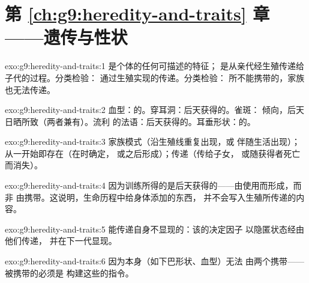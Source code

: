 \section*{第 \ref{ch:g9:heredity-and-traits} 章——遗传与性状}

\begin{solution}{exo:g9:heredity-and-traits:1}
是个体的任何可描述的特征；
是从亲代经生殖传递给子代的过程。分类检验：
通过生殖实现的传递。分类检验：
所不能携带的，家族也无法传递。
\end{solution}

\begin{solution}{exo:g9:heredity-and-traits:2}
血型：的。穿耳洞：后天获得的。雀斑：
倾向，后天日晒所致（两者兼有）。流利
的法语：后天获得的。耳垂形状：的。
\end{solution}

\begin{solution}{exo:g9:heredity-and-traits:3}
家族模式（沿生殖线重复出现，或
伴随生活出现）；从一开始即存在（在时确定，
或之后形成）；传递（传给子女，
或随获得者死亡而消失）。
\end{solution}

\begin{solution}{exo:g9:heredity-and-traits:4}
因为训练所得的是后天获得的——由使用而形成，而非
由携带。这说明，生命历程中给身体添加的东西，
并不会写入生殖所传递的内容。
\end{solution}

\begin{solution}{exo:g9:heredity-and-traits:5}
能传递自身不显现的：该的决定因子
以隐匿状态经由他们传递，
并在下一代显现。
\end{solution}

\begin{solution}{exo:g9:heredity-and-traits:6}
因为本身（如下巴形状、血型）无法
由两个携带——被携带的必须是
构建这些的指令。
\end{solution}

